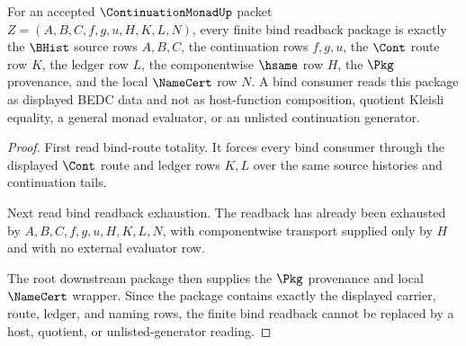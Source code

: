 \begin{theorem}
\label{thm:continuation-monad-finite-bind-readback-package}
For an accepted $\ContinuationMonadUp$ packet $Z=(A,B,C,f,g,u,H,K,L,N)$, every finite bind readback package is exactly the $\BHist$ source rows $A,B,C$, the continuation rows $f,g,u$, the $\Cont$ route row $K$, the ledger row $L$, the componentwise $\hsame$ row $H$, the $\Pkg$ provenance, and the local $\NameCert$ row $N$. A bind consumer reads this package as displayed BEDC data and not as host-function composition, quotient Kleisli equality, a general monad evaluator, or an unlisted continuation generator.
\end{theorem}
\begin{proof}
First read bind-route totality. It forces every bind consumer through the displayed $\Cont$ route and ledger rows $K,L$ over the same source histories and continuation tails.

Next read bind readback exhaustion. The readback has already been exhausted by $A,B,C,f,g,u,H,K,L,N$, with componentwise transport supplied only by $H$ and with no external evaluator row.

The root downstream package then supplies the $\Pkg$ provenance and local $\NameCert$ wrapper. Since the package contains exactly the displayed carrier, route, ledger, and naming rows, the finite bind readback cannot be replaced by a host, quotient, or unlisted-generator reading.
\end{proof}

